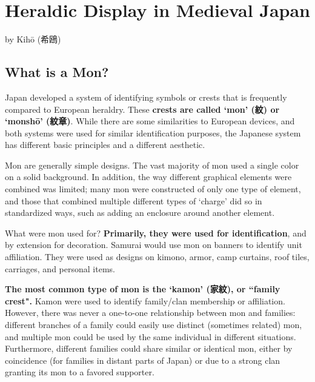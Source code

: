 \documentclass{article}
\begin{document}
\chapter{\Huge Heraldic Display in Medieval Japan}

\begin{center}
\large by Kih\=o (希鴎)
\end{center}

\section{What is a Mon?}

  Japan developed a system of identifying symbols or crests that is
  frequently compared to European heraldry.  These \textbf{crests are called
  `mon' (紋) or `monshō' (紋章)}. While there are some
  similarities to European devices, and both systems were used for
  similar identification purposes, the Japanese system has different
  basic principles and a different aesthetic.

  Mon are generally simple designs.  The vast majority
  of mon used a single color on a solid background.  In addition, the way
  different graphical elements were combined was limited; many mon
  were constructed of only one type of element, and those that
  combined multiple different types of `charge' did so in standardized
  ways, such as adding an enclosure around another element.

  What were mon used for?  \textbf{Primarily, they were used for
  identification}, and by extension for decoration.  Samurai would use
  mon on banners to identify unit affiliation.  They were used as
  designs on kimono, armor, camp curtains, roof tiles, carriages, and
  personal items.

  \textbf{The most common type of mon is the `kamon' (家紋), or
  ``family crest".}
  Kamon were used to identify family/clan membership or affiliation.
  However, there was never a one-to-one relationship between mon and
  families: different branches of a family could easily use distinct
  (sometimes related) mon, and multiple mon could be used by the same
  individual in different situations.  Furthermore, different families
  could share similar or identical mon, either by coincidence (for
  families in distant parts of Japan) or due to a strong clan granting
  its mon to a favored supporter.
  
\end{document}
